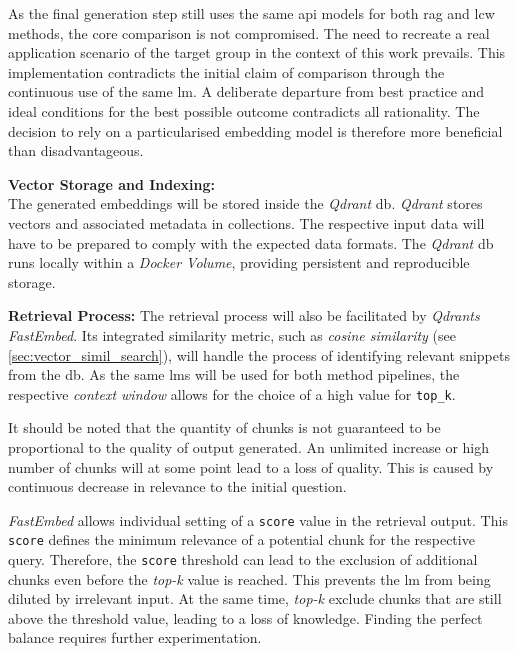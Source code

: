     As the final generation step still uses the same \ac{api} models for both \ac{rag} and \ac{lcw} methods, the core comparison is not compromised.
    The need to recreate a real application scenario of the target group in the context of this work prevails.
    This implementation contradicts the initial claim of comparison through the continuous use of the same \ac{lm}.
    A deliberate departure from best practice and ideal conditions for the best possible outcome contradicts all rationality.
    The decision to rely on a particularised embedding model is therefore more beneficial than disadvantageous.
    
\noindent\textbf{Vector Storage and Indexing:}\\
    The generated embeddings will be stored inside the \textit{Qdrant} \ac{db}.
    \textit{Qdrant} stores vectors and associated metadata in collections.
    The respective input data will have to be prepared to comply with the expected data formats.
    The \textit{Qdrant} \ac{db} runs locally within a \textit{Docker Volume}, providing persistent and reproducible storage.
    
\noindent\textbf{Retrieval Process:}\newline
    The retrieval process will also be facilitated by \textit{Qdrants FastEmbed}.
    Its integrated similarity metric, such as \textit{cosine similarity} (see \cref{sec:vector_simil_search}), will handle the process of identifying relevant snippets from the \ac{db}.
    As the same \acp{lm} will be used for both method pipelines, the respective \textit{context window} allows for the choice of a high value for \texttt{top\_k}.
    
    It should be noted that the quantity of chunks is not guaranteed to be proportional to the quality of output generated.
    An unlimited increase or high number of chunks will at some point lead to a loss of quality.
    This is caused by continuous decrease in relevance to the initial question.
    
    \textit{FastEmbed} allows individual setting of a \texttt{score} value in the retrieval output.
    This \texttt{score} defines the minimum relevance of a potential chunk for the respective query.
    Therefore, the \texttt{score} threshold can lead to the exclusion of additional chunks even before the \textit{top-k} value is reached.
    This prevents the \ac{lm} from being diluted by irrelevant input.
    At the same time, \textit{top-k} exclude chunks that are still above the threshold value, leading to a loss of knowledge.
    Finding the perfect balance requires further experimentation.
    
